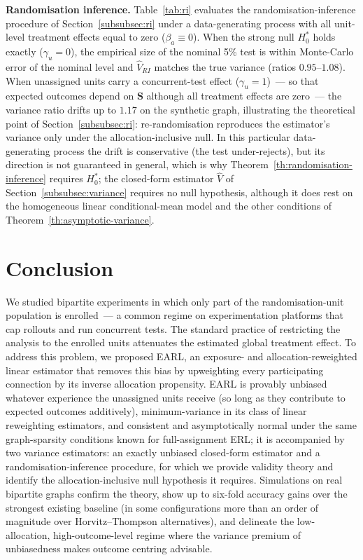 \documentclass[sigconf,nonacm]{acmart}
\begin{document}
\textbf{Randomisation inference.} Table~\ref{tab:ri} evaluates the randomisation-inference procedure of Section~\ref{subsubsec:ri} under a data-generating process with all unit-level treatment effects equal to zero ($\beta_a\equiv 0$). When the strong null $H_0^*$ holds exactly ($\gamma_u=0$), the empirical size of the nominal 5\% test is within Monte-Carlo error of the nominal level and $\hat V_{RI}$ matches the true variance (ratios $0.95$--$1.08$). When unassigned units carry a concurrent-test effect ($\gamma_u=1$)~--- so that expected outcomes depend on $\mathbf S$ although all treatment effects are zero~--- the variance ratio drifts up to $1.17$ on the synthetic graph, illustrating the theoretical point of Section~\ref{subsubsec:ri}: re-randomisation reproduces the estimator's variance only under the allocation-inclusive null. In this particular data-generating process the drift is conservative (the test under-rejects), but its direction is not guaranteed in general, which is why Theorem~\ref{th:randomisation-inference} requires $H_0^*$; the closed-form estimator $\hat V$ of Section~\ref{subsubsec:variance} requires no null hypothesis, although it does rest on the homogeneous linear conditional-mean model and the other conditions of Theorem~\ref{th:asymptotic-variance}.

\section{Conclusion}\label{sec:conclusion}

We studied bipartite experiments in which only part of the randomisation-unit population is enrolled~--- a common regime on experimentation platforms that cap rollouts and run concurrent tests. The standard practice of restricting the analysis to the enrolled units attenuates the estimated global treatment effect. To address this problem, we proposed EARL, an exposure- and allocation-reweighted linear estimator that removes this bias by upweighting every participating connection by its inverse allocation propensity. EARL is provably unbiased whatever experience the unassigned units receive (so long as they contribute to expected outcomes additively), minimum-variance in its class of linear reweighting estimators, and consistent and asymptotically normal under the same graph-sparsity conditions known for full-assignment ERL; it is accompanied by two variance estimators: an exactly unbiased closed-form estimator and a randomisation-inference procedure, for which we provide validity theory and identify the allocation-inclusive null hypothesis it requires. Simulations on real bipartite graphs confirm the theory, show up to six-fold accuracy gains over the strongest existing baseline (in some configurations more than an order of magnitude over Horvitz--Thompson alternatives), and delineate the low-allocation, high-outcome-level regime where the variance premium of unbiasedness makes outcome centring advisable.
\end{document}
